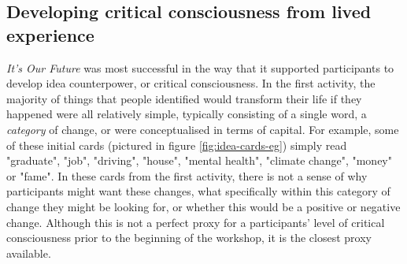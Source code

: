 \subsection{Developing critical consciousness from lived experience}
\textit{It's Our Future} was most successful in the way that it supported participants to develop idea counterpower, or critical consciousness. In the first activity, the majority of things that people identified would transform their life if they happened were all relatively simple, typically consisting of a single word, a \textit{category} of change, or were conceptualised in terms of capital. For example, some of these initial cards (pictured in figure \ref{fig:idea-cards-eg}) simply read "graduate", "job", "driving", "house", "mental health", "climate change", "money" or "fame". In these cards from the first activity, there is not a sense of why participants might want these changes, what specifically within this category of change they might be looking for, or whether this would be a positive or negative change. Although this is not a perfect proxy for a participants' level of critical consciousness prior to the beginning of the workshop, it is the closest proxy available. 

